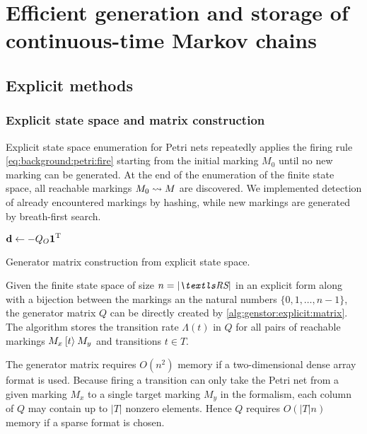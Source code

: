\chapter{Efficient generation and storage of continuous-time Markov chains}
\label{chap:genstor}

\section{Explicit methods}

\subsection{Explicit state space and matrix construction}

Explicit state space enumeration for Petri nets repeatedly applies the
firing rule \vref{eq:background:petri:fire} starting from the initial
marking $M_0$ until no new marking can be generated. At the end of the
enumeration of the finite state space, all reachable markings
$M_0 \leadsto M$ are discovered. We implemented detection of already
encountered markings by hashing, while new markings are generated by
breath-first search.

\begin{algorithm}
  \;
  $\bm{\mathrm{d}} \gets - Q_O \bm{\mathrm{1}}^{\mathrm{T}}$\;
  \;
  \caption{Generator matrix construction from explicit state space.}
  \label{alg:genstor:explicit:matrix}
\end{algorithm}

Given the finite state space of size $n = \lvert \RS \rvert$ in an
explicit form along with a bijection between the markings an the
natural numbers $\{0, 1, \ldots, n - 1\}$, the generator matrix $Q$
can be directly created by \cref{alg:genstor:explicit:matrix}. The
algorithm stores the transition rate $\Lambda(t)$ in $Q$ for all pairs
of reachable markings $M_x \mathbin{[t\rangle} M_y$ and transitions $t \in T$.

The generator matrix requires $O(n^2)$ memory if a two-dimensional
dense array format is used. Because firing a transition can only take
the Petri net from a given marking $M_x$ to a single target marking
$M_y$ in the  formalism, each column of $Q$ may contain up
to $\lvert T \rvert$ nonzero elements. Hence $Q$ requires $O(\lvert T
\rvert n)$ memory if a sparse format is chosen.

